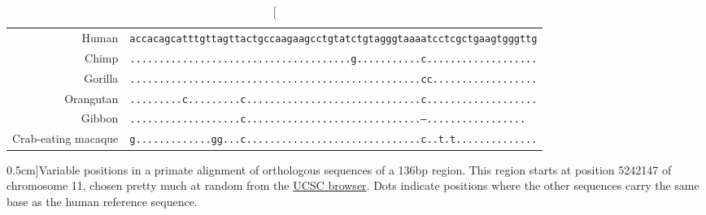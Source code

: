 \begin{table}
\small{
  \begin{tabular}{rl}
Human & \texttt{accacagcatttgttagttactgccaagaagcctgtatctgtagggtaaaatcctcgctgaagtgggttg}\\
Chimp & \texttt{......................................g...........c...................}\\
Gorilla & \texttt{..................................................cc..................}\\
Orangutan & \texttt{.........c.........c..............................c...................}\\
Gibbon & \texttt{...................c..............................---.................}\\
Crab-eating macaque & \texttt{g.............gg...c..............................c..t.t..............}\\
  \end{tabular}
  }
\caption[][0.5cm]{Variable positions in a primate alignment of orthologous sequences
  of a 136bp region. This region starts at position 5242147 of
  chromosome 11, chosen pretty much at random from the \href{https://genome.ucsc.edu/cgi-bin/hgc?hgsid=751620175_qgtFpsA9hP8yVBVZ1ezZl3Iy3N1L\&c=chr17\&l=43084819\&r=43084957\&o=43084819\&t=43084957\&g=multiz30way\&i=multiz30way}{UCSC browser}. Dots indicate
  positions where the other sequences carry the same base as the human
reference sequence. } 
\end{table}

